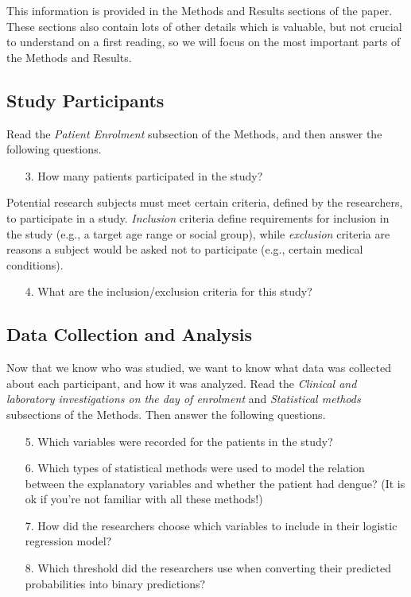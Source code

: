 \documentclass[11pt]{article}
\begin{document}
\noindent This information is provided in the Methods and Results sections of the paper. These sections also contain lots of other details which is valuable, but not crucial to understand on a first reading, so we will focus on the most important parts of the Methods and Results.

\subsection*{Study Participants}

Read the \textit{Patient Enrolment} subsection of the Methods, and then answer the following questions.

\begin{enumerate}
    \item[3.]  How many patients participated in the study?
\end{enumerate}

\noindent Potential research subjects must meet certain criteria, defined by the researchers, to participate in a study. \textit{Inclusion} criteria define requirements for inclusion in the study (e.g., a target age range or social group), while \textit{exclusion} criteria are reasons a subject would be asked not to participate (e.g., certain medical conditions). 

\begin{enumerate}
    \item[4.] What are the inclusion/exclusion criteria for this study?
\end{enumerate}


\subsection*{Data Collection and Analysis}

Now that we know who was studied, we want to know what data was collected about each participant, and how it was analyzed. Read the \textit{Clinical and laboratory investigations on the day of enrolment} and \textit{Statistical methods} subsections of the Methods. Then answer the following questions.

\begin{enumerate}
\item[5.] Which variables were recorded for the patients in the study?

\item[6.] Which types of statistical methods were used to model the relation between the explanatory variables and whether the patient had dengue? (It is ok if you're not familiar with all these methods!)

\item[7.] How did the researchers choose which variables to include in their logistic regression model?

\item[8.] Which threshold did the researchers use when converting their predicted probabilities into binary predictions?

\end{enumerate}
\end{document}
